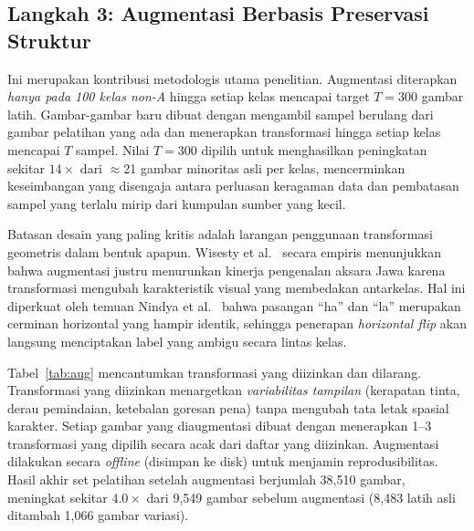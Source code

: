 \documentclass[conference]{IEEEtran}
\begin{document}
\subsection{Langkah 3: Augmentasi Berbasis Preservasi Struktur}

Ini merupakan kontribusi metodologis utama penelitian.
Augmentasi diterapkan \textit{hanya pada 100 kelas non-A} hingga
setiap kelas mencapai target $T = 300$ gambar latih.
Gambar-gambar baru dibuat dengan mengambil sampel berulang dari
gambar pelatihan yang ada dan menerapkan transformasi hingga
setiap kelas mencapai $T$ sampel.
Nilai $T = 300$ dipilih untuk menghasilkan peningkatan sekitar
$14\times$ dari $\approx$21 gambar minoritas asli per kelas,
mencerminkan keseimbangan yang disengaja antara perluasan keragaman
data dan pembatasan sampel yang terlalu mirip dari kumpulan sumber
yang kecil.

Batasan desain yang paling kritis adalah larangan penggunaan
transformasi geometris dalam bentuk apapun.
Wisesty et al.~\cite{wisesty2026} secara empiris menunjukkan bahwa
augmentasi justru menurunkan kinerja pengenalan aksara Jawa karena
transformasi mengubah karakteristik visual yang membedakan
antarkelas.
Hal ini diperkuat oleh temuan Nindya et al.~\cite{nindya2025} bahwa
pasangan ``ha'' dan ``la'' merupakan cerminan horizontal yang hampir
identik, sehingga penerapan \textit{horizontal flip} akan langsung
menciptakan label yang ambigu secara lintas kelas.

Tabel~\ref{tab:aug} mencantumkan transformasi yang diizinkan dan
dilarang.
Transformasi yang diizinkan menargetkan \textit{variabilitas
tampilan} (kerapatan tinta, derau pemindaian, ketebalan goresan
pena) tanpa mengubah tata letak spasial karakter.
Setiap gambar yang diaugmentasi dibuat dengan menerapkan 1--3
transformasi yang dipilih secara acak dari daftar yang diizinkan.
Augmentasi dilakukan secara \textit{offline} (disimpan ke disk)
untuk menjamin reprodusibilitas.
Hasil akhir set pelatihan setelah augmentasi berjumlah 38,510 gambar,
meningkat sekitar $4.0\times$ dari 9,549 gambar sebelum augmentasi
(8,483 latih asli ditambah 1,066 gambar variasi).
\end{document}

